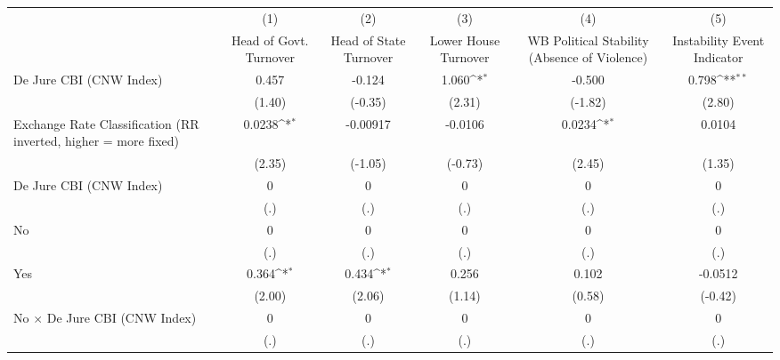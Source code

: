 {
\def\sym#1{\ifmmode^{#1}\else\(^{#1}\)\fi}
\begin{tabular*}{\linewidth}{@{\hskip\tabcolsep\extracolsep\fill}l*{5}{c}}
\hline\hline
                &\multicolumn{1}{c}{(1)}&\multicolumn{1}{c}{(2)}&\multicolumn{1}{c}{(3)}&\multicolumn{1}{c}{(4)}&\multicolumn{1}{c}{(5)}\\
                &\multicolumn{1}{c}{Head of Govt. Turnover}&\multicolumn{1}{c}{Head of State Turnover}&\multicolumn{1}{c}{Lower House Turnover}&\multicolumn{1}{c}{WB Political Stability (Absence of Violence)}&\multicolumn{1}{c}{Instability Event Indicator}\\
\hline
De Jure CBI (CNW Index)&    0.457         &   -0.124         &    1.060\sym{*}  &   -0.500         &    0.798\sym{**} \\
                &   (1.40)         &  (-0.35)         &   (2.31)         &  (-1.82)         &   (2.80)         \\
[1em]
Exchange Rate Classification (RR inverted, higher = more fixed)&   0.0238\sym{*}  & -0.00917         &  -0.0106         &   0.0234\sym{*}  &   0.0104         \\
                &   (2.35)         &  (-1.05)         &  (-0.73)         &   (2.45)         &   (1.35)         \\
[1em]
De Jure CBI (CNW Index)&        0         &        0         &        0         &        0         &        0         \\
                &      (.)         &      (.)         &      (.)         &      (.)         &      (.)         \\
[1em]
No              &        0         &        0         &        0         &        0         &        0         \\
                &      (.)         &      (.)         &      (.)         &      (.)         &      (.)         \\
[1em]
Yes             &    0.364\sym{*}  &    0.434\sym{*}  &    0.256         &    0.102         &  -0.0512         \\
                &   (2.00)         &   (2.06)         &   (1.14)         &   (0.58)         &  (-0.42)         \\
[1em]
No $\times$ De Jure CBI (CNW Index)&        0         &        0         &        0         &        0         &        0         \\
                &      (.)         &      (.)         &      (.)         &      (.)         &      (.)         \\

\end{tabular*}}
